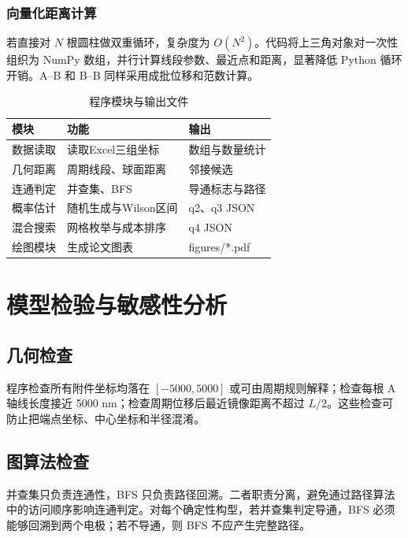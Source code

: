 \documentclass[12pt,a4paper,fontset=windows]{ctexart}
\begin{document}
\subsubsection{向量化距离计算}
若直接对 $N$ 根圆柱做双重循环，复杂度为 $O(N^2)$。代码将上三角对象对一次性组织为 NumPy 数组，并行计算线段参数、最近点和距离，显著降低 Python 循环开销。A--B 和 B--B 同样采用成批位移和范数计算。

\begin{table}[H]\centering\caption{程序模块与输出文件}\begin{tabular}{p{3.2cm}p{5cm}p{5cm}}\toprule 模块&功能&输出\\\midrule 数据读取&读取Excel三组坐标&数组与数量统计\\几何距离&周期线段、球面距离&邻接候选\\连通判定&并查集、BFS&导通标志与路径\\概率估计&随机生成与Wilson区间&q2、q3 JSON\\混合搜索&网格枚举与成本排序&q4 JSON\\绘图模块&生成论文图表&figures/*.pdf\\\bottomrule\end{tabular}\end{table}

\section{模型检验与敏感性分析}

\subsection{几何检查}
程序检查所有附件坐标均落在 $[-5000,5000]$ 或可由周期规则解释；检查每根 A 轴线长度接近 5000 nm；检查周期位移后最近镜像距离不超过 $L/2$。这些检查可防止把端点坐标、中心坐标和半径混淆。

\subsection{图算法检查}
并查集只负责连通性，BFS 只负责路径回溯。二者职责分离，避免通过路径算法中的访问顺序影响连通判定。对每个确定性构型，若并查集判定导通，BFS 必须能够回溯到两个电极；若不导通，则 BFS 不应产生完整路径。
\end{document}
